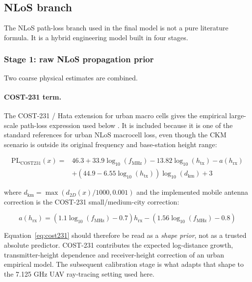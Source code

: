\subsection{NLoS branch}
\label{sec:nlos_branch}

The NLoS path-loss branch used in the final model is not a pure literature
formula. It is a hybrid engineering model built in four stages.

\subsubsection{Stage 1: raw NLoS propagation prior}

Two coarse physical estimates are combined.

\paragraph{COST-231 term.}
The COST-231 / Hata extension for urban macro cells gives the empirical
large-scale path-loss expression used below \cite{cost231}. It is included
because it is one of the standard references for urban NLoS macrocell loss,
even though the CKM scenario is outside its original frequency and base-station
height range:

\begin{equation}
\begin{aligned}
\mathrm{PL}_{\mathrm{COST231}}(x)
={}&
46.3 + 33.9 \log_{10}(f_{\mathrm{MHz}})
- 13.82 \log_{10}(h_{\mathrm{tx}})
- a(h_{\mathrm{rx}})\\
&+
\left(44.9 - 6.55 \log_{10}(h_{\mathrm{tx}})\right)
\log_{10}(d_{\mathrm{km}})
+ 3
\end{aligned}
\label{eq:cost231}
\end{equation}

where $d_{\mathrm{km}} = \max(d_{2D}(x)/1000, 0.001)$ and the implemented
mobile antenna correction is the COST-231 small/medium-city correction:

\begin{equation}
a(h_{\mathrm{rx}})
=
\left(1.1\log_{10}(f_{\mathrm{MHz}})-0.7\right)h_{\mathrm{rx}}
-
\left(1.56\log_{10}(f_{\mathrm{MHz}})-0.8\right)
\label{eq:cost231_a}
\end{equation}

Equation~\eqref{eq:cost231} should therefore be read as a \emph{shape prior},
not as a trusted absolute predictor. COST-231 contributes the expected
log-distance growth, transmitter-height dependence and receiver-height
correction of an urban empirical model. The subsequent calibration stage is
what adapts that shape to the 7.125 GHz UAV ray-tracing setting used here.

